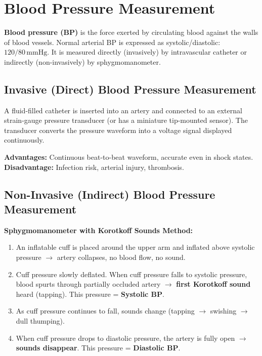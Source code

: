 \documentclass[12pt,a4paper]{article}
\begin{document}
\section{Blood Pressure Measurement}

\begin{tcolorbox}[defbox, title={\textbf{Blood Pressure}}]
\textbf{Blood pressure (BP)} is the force exerted by circulating blood against the walls of blood vessels. Normal arterial BP is expressed as systolic/diastolic: $120/80\,\text{mmHg}$. It is measured directly (invasively) by intravascular catheter or indirectly (non-invasively) by sphygmomanometer.
\end{tcolorbox}

\subsection{Invasive (Direct) Blood Pressure Measurement}

A fluid-filled catheter is inserted into an artery and connected to an external strain-gauge pressure transducer (or has a miniature tip-mounted sensor). The transducer converts the pressure waveform into a voltage signal displayed continuously.

\textbf{Advantages:} Continuous beat-to-beat waveform, accurate even in shock states. \\
\textbf{Disadvantage:} Infection risk, arterial injury, thrombosis.

\subsection{Non-Invasive (Indirect) Blood Pressure Measurement}

\textbf{Sphygmomanometer with Korotkoff Sounds Method:}
\begin{enumerate}[leftmargin=*, itemsep=3pt]
  \item An inflatable cuff is placed around the upper arm and inflated above systolic pressure $\to$ artery collapses, no blood flow, no sound.
  \item Cuff pressure slowly deflated. When cuff pressure falls to systolic pressure, blood spurts through partially occluded artery $\to$ \textbf{first Korotkoff sound} heard (tapping). This pressure = \textbf{Systolic BP}.
  \item As cuff pressure continues to fall, sounds change (tapping $\to$ swishing $\to$ dull thumping).
  \item When cuff pressure drops to diastolic pressure, the artery is fully open $\to$ \textbf{sounds disappear}. This pressure = \textbf{Diastolic BP}.
\end{enumerate}
\end{document}
